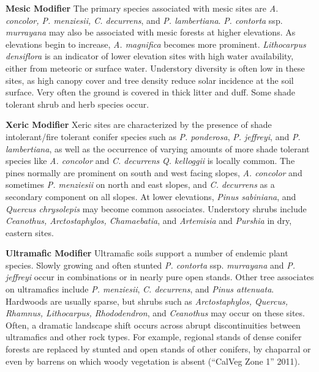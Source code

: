 \begin{adjustwidth}{2cm}{}
\medskip
\noindent \textbf{Mesic Modifier } The primary species associated with mesic sites are \emph{A. concolor, P. menziesii, C. decurrens}, and \emph{P. lambertiana}. \emph{P. contorta} ssp. \emph{murrayana} may also be associated with mesic forests at higher elevations. As elevations begin to increase, \emph{A. magnifica} becomes more prominent. \emph{Lithocarpus densiflora} is an indicator of lower elevation sites with high water availability, either from meteoric or surface water. Understory diversity is often low in these sites, as high canopy cover and tree density reduce solar incidence at the soil surface. Very often the ground is covered in thick litter and duff. Some shade tolerant shrub and herb species occur.

\medskip
\noindent \textbf{Xeric Modifier}  Xeric sites are characterized by the presence of shade intolerant/fire tolerant conifer species such as \emph{P. ponderosa}, \emph{P. jeffreyi}, and \emph{P. lambertiana}, as well as the occurrence of varying amounts of more shade tolerant species like \emph{A. concolor} and \emph{C. decurrens}  \emph{Q. kelloggii} is locally common. The pines normally are prominent on south and west facing slopes, \emph{A. concolor} and sometimes \emph{P. menziesii}  on north and east slopes, and \emph{C. decurrens} as a secondary component on all slopes. At lower elevations, \emph{Pinus sabiniana}, and \emph{Quercus chrysolepis} may become common associates. Understory shrubs include \emph{Ceanothus, Arctostaphylos, Chamaebatia}, and \emph{Artemisia} and \emph{Purshia} in dry, eastern sites.

\medskip
\noindent \textbf{Ultramafic Modifier} Ultramafic soils support a number of endemic plant species. Slowly growing and often stunted \emph{P. contorta} ssp. \emph{murrayana} and \emph{P. jeffreyi} occur in combinations or in nearly pure open stands. Other tree associates on ultramafics include \emph{P. menziesii}, \emph{C. decurrens}, and \emph{Pinus attenuata}. Hardwoods are usually sparse, but shrubs such as \emph{Arctostaphylos, Quercus, Rhamnus, Lithocarpus, Rhododendron}, and \emph{Ceanothus} may occur on these sites. Often, a dramatic landscape shift occurs across abrupt discontinuities between ultramafics and other rock types. For example, regional stands of dense conifer forests are replaced by stunted and open stands of other conifers, by chaparral or even by barrens on which woody vegetation is absent (``CalVeg Zone 1'' 2011).

\end{adjustwidth}


